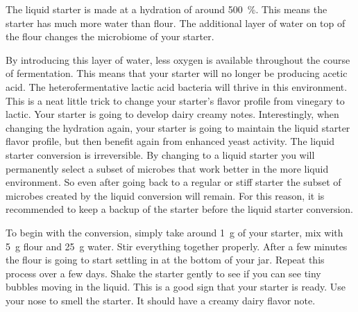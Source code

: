 \begin{flowchart}[!htb]
\centering
  
  \caption[Converting to a liquid starter]{The process to convert your regular
      or stiff starter into a liquid starter. The whole process takes around
      3~days. The longer you maintain your starter at the suggested hydration
      level, the more adapted your microorganisms become. It is recommended to
      keep a backup of your original starter as the liquid environment will
      select anaerobic microorganisms. This boosts bacteria that create lactic
      acid rather than acetic acid. The resulting acidity will be perceived as
      milder. When beginning with a liquid starter your stiff starter will
      feature mild dairy notes. When beginning this process with a regular
      starter your created stiff starter will feature both dairy
      and vinegary notes.}%
  \label{flc:liquid-starter-conversion}
\end{flowchart}

The liquid starter is made at a hydration of around \qty{500}{\percent}. This means
the starter has much more water than flour. The additional layer of water on
top of the flour changes the microbiome of your starter.

By introducing this layer of water, less oxygen is available throughout the
course of fermentation. This means that your starter will no longer be
producing acetic acid. The heterofermentative lactic acid bacteria will thrive
in this environment. This is a neat little trick to change your starter's
flavor profile from vinegary to lactic. Your starter is going to develop dairy
creamy notes. Interestingly, when changing the hydration again, your starter
is going to maintain the liquid starter flavor profile, but then benefit again
from enhanced yeast activity. The liquid starter conversion is irreversible.
By changing to a liquid starter you will permanently select a subset of
microbes that work better in the more liquid environment. So even after going
back to a regular or stiff starter the subset of microbes created by the
liquid conversion will remain. For this reason, it is recommended to keep a
backup of the starter before the liquid starter conversion.

To begin with the
conversion, simply take around \qty{1}{\gram} of your starter, mix with \qty{5}{\gram} flour and
\qty{25}{\gram} water. Stir everything together properly. After a few minutes the flour is
going to start settling in at the bottom of your jar. Repeat this process over
a few days. Shake the starter gently to see if you can see tiny  bubbles
moving in the liquid. This is a good sign that your starter is ready. Use your
nose to smell the starter. It should have a creamy dairy flavor note.

